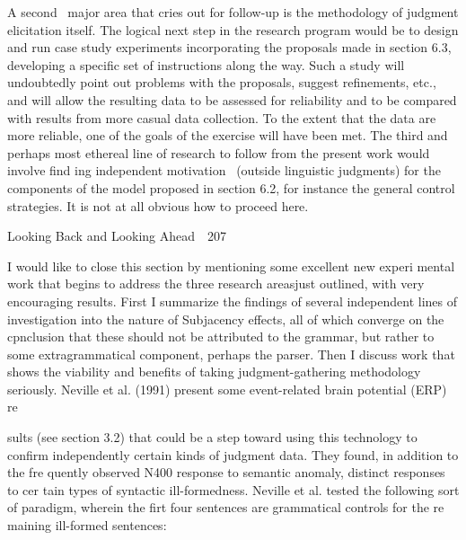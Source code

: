 \begin{styleStandard}
A second \ major area that cries out for follow-up is the methodology of judgment elicitation itself. The logical next step in the research program would be to design and run case study experiments incorporating the proposals made in section 6.3, developing a specific set of instructions along the way. Such a study will undoubtedly point out problems with the proposals, suggest refinements, etc., and will allow the resulting data to be assessed for reliability and to be compared with results from more casual data collection. To the extent that the data are more reliable, one of the goals of the exercise will have been met. The third and perhaps most ethereal line of research to follow from the present work would involve find\- ing independent motivation \ (outside linguistic judgments) for the components of the model proposed in section 6.2, for instance the general control strategies. It is not at all obvious how to proceed here.
\end{styleStandard}


\clearpage\setcounter{page}{1}\begin{styleStandard}
Looking Back and Looking Ahead\ \ 207
\end{styleStandard}


\begin{styleStandard}
I would like to close this section by mentioning some excellent new experi\- mental work that begins to address the three research areasjust outlined, with very encouraging results. First I summarize the findings of several independent lines of investigation into the nature of Subjacency effects, all of which converge on the cpnclusion that these should not be attributed to the grammar, but rather to some extragrammatical component, perhaps the parser. Then I discuss work that shows the viability and benefits of taking judgment-gathering methodology seriously. Neville et al. (1991) present some event-related brain potential (ERP) re\-
\end{styleStandard}


\begin{styleStandard}
sults (see section 3.2) that could be a step toward using this technology to confirm independently certain kinds of judgment data. They found, in addition to the fre\- quently observed N400 response to semantic anomaly, distinct responses to cer\- tain types of syntactic ill-formedness. Neville et al. tested the following sort of paradigm, wherein the firt four sentences are grammatical controls for the re\- maining ill-formed sentences:
\end{styleStandard}


